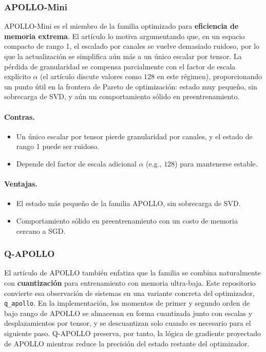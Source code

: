 \subsubsection{APOLLO-Mini}
APOLLO-Mini es el miembro de la familia optimizado para \textbf{eficiencia de memoria extrema}. El artículo lo motiva argumentando que, en un espacio compacto de rango 1, el escalado por canales se vuelve demasiado ruidoso, por lo que la actualización se simplifica aún más a un único escalar por tensor. La pérdida de granularidad se compensa parcialmente con el factor de escala explícito $\alpha$ (el artículo discute valores como $128$ en este régimen), proporcionando un punto útil en la frontera de Pareto de optimización: estado muy pequeño, sin sobrecarga de SVD, y aún un comportamiento sólido en preentrenamiento.

\paragraph{Contras.}
\begin{itemize}[leftmargin=*]
\item Un único escalar por tensor pierde granularidad por canales, y el estado de rango 1 puede ser ruidoso.
\item Depende del factor de escala adicional $\alpha$ (e.g., $128$) para mantenerse estable.
\end{itemize}

\paragraph{Ventajas.}
\begin{itemize}[leftmargin=*]
\item El estado más pequeño de la familia APOLLO, sin sobrecarga de SVD.
\item Comportamiento sólido en preentrenamiento con un costo de memoria cercano a SGD.
\end{itemize}

\subsubsection{Q-APOLLO}
El artículo de APOLLO también enfatiza que la familia se combina naturalmente con \textbf{cuantización} para entrenamiento con memoria ultra-baja. Este repositorio convierte esa observación de sistemas en una variante concreta del optimizador, \texttt{q\_apollo}. En la implementación, los momentos de primer y segundo orden de bajo rango de APOLLO se almacenan en forma cuantizada junto con escalas y desplazamientos por tensor, y se descuantizan solo cuando es necesario para el siguiente paso. Q-APOLLO preserva, por tanto, la lógica de gradiente proyectado de APOLLO mientras reduce la precisión del estado restante del optimizador.

